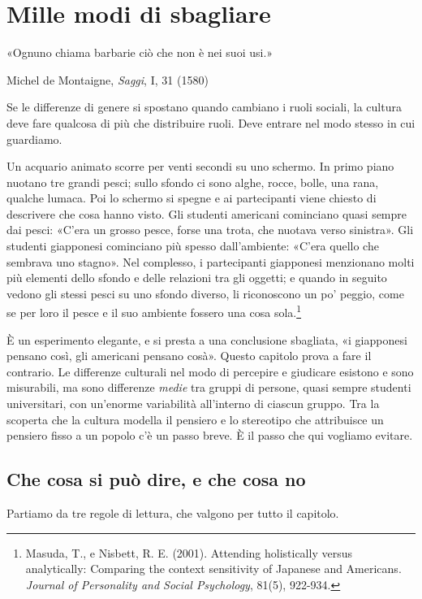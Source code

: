 \chapter{Mille modi di sbagliare}
\label{cap:p2c13}

\epigraph{«Ognuno chiama barbarie ciò che non è nei suoi usi.»}{Michel de Montaigne, \textit{Saggi}, I, 31 (1580)}

Se le differenze di genere si spostano quando cambiano i ruoli sociali, la cultura deve fare qualcosa di più che distribuire ruoli. Deve entrare nel modo stesso in cui guardiamo.

Un acquario animato scorre per venti secondi su uno schermo. In primo piano nuotano tre grandi pesci; sullo sfondo ci sono alghe, rocce, bolle, una rana, qualche lumaca. Poi lo schermo si spegne e ai partecipanti viene chiesto di descrivere che cosa hanno visto. Gli studenti americani cominciano quasi sempre dai pesci: «C'era un grosso pesce, forse una trota, che nuotava verso sinistra». Gli studenti giapponesi cominciano più spesso dall'ambiente: «C'era quello che sembrava uno stagno». Nel complesso, i partecipanti giapponesi menzionano molti più elementi dello sfondo e delle relazioni tra gli oggetti; e quando in seguito vedono gli stessi pesci su uno sfondo diverso, li riconoscono un po' peggio, come se per loro il pesce e il suo ambiente fossero una cosa sola.\footnote{Masuda, T., e Nisbett, R. E. (2001). Attending holistically versus analytically: Comparing the context sensitivity of Japanese and Americans. \textit{Journal of Personality and Social Psychology}, 81(5), 922-934.}

È un esperimento elegante, e si presta a una conclusione sbagliata, «i giapponesi pensano così, gli americani pensano cosà». Questo capitolo prova a fare il contrario. Le differenze culturali nel modo di percepire e giudicare esistono e sono misurabili, ma sono differenze \textit{medie} tra gruppi di persone, quasi sempre studenti universitari, con un'enorme variabilità all'interno di ciascun gruppo. Tra la scoperta che la cultura modella il pensiero e lo stereotipo che attribuisce un pensiero fisso a un popolo c'è un passo breve. È il passo che qui vogliamo evitare.

\section{Che cosa si può dire, e che cosa no}

Partiamo da tre regole di lettura, che valgono per tutto il capitolo.

